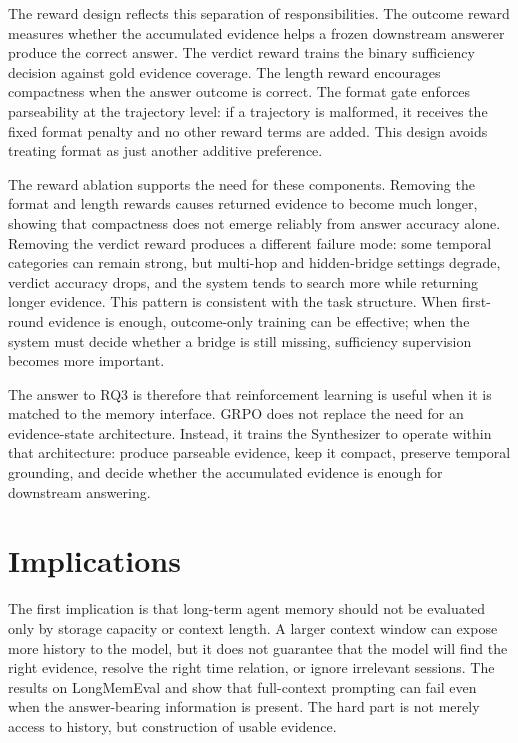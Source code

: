 The reward design reflects this separation of responsibilities. The outcome
reward measures whether the accumulated evidence helps a frozen downstream
answerer produce the correct answer. The verdict reward trains the binary
sufficiency decision against gold evidence coverage. The length reward
encourages compactness when the answer outcome is
correct. The format gate enforces parseability at the trajectory level: if a
trajectory is malformed, it receives the fixed format penalty and no other
reward terms are added. This design avoids treating format as just another
additive preference.

The reward ablation supports the need for these components. Removing the format
and length rewards causes returned evidence to become much longer, showing that
compactness does not emerge reliably from answer accuracy alone. Removing the
verdict reward produces a different failure mode: some temporal categories can
remain strong, but multi-hop and hidden-bridge settings degrade, verdict
accuracy drops, and the system tends to search more while returning longer
evidence. This pattern is consistent with the task structure. When first-round
evidence is enough, outcome-only training can be effective; when the system
must decide whether a bridge is still missing, sufficiency supervision becomes
more important.

The answer to RQ3 is therefore that reinforcement learning is useful when it is
matched to the memory interface. GRPO does not replace the need for an
evidence-state architecture. Instead, it trains the Synthesizer to operate
within that architecture: produce parseable evidence, keep it compact, preserve
temporal grounding, and decide whether the accumulated evidence is enough for
downstream answering.

\section{Implications}
\label{sec:conclusion-implications}

The first implication is that long-term agent memory should not be evaluated
only by storage capacity or context length. A larger context window can expose
more history to the model, but it does not guarantee that the model will find
the right evidence, resolve the right time relation, or ignore irrelevant
sessions. The results on LongMemEval and \bench{} show that full-context
prompting can fail even when the answer-bearing information is present. The
hard part is not merely access to history, but construction of usable evidence.

